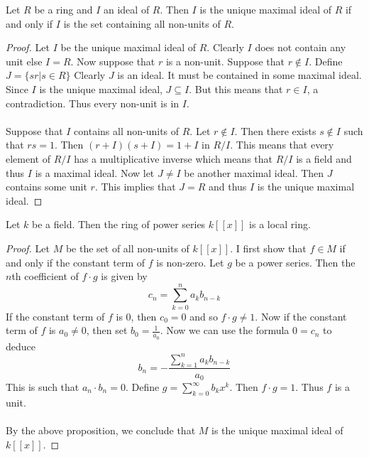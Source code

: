 \documentclass[a4paper]{article}
\begin{document}
\begin{prp}{}{} Let $R$ be a ring and $I$ an ideal of $R$. Then $I$ is the unique maximal ideal of $R$ if and only if $I$ is the set containing all non-units of $R$. 
\begin{proof}
Let $I$ be the unique maximal ideal of $R$. Clearly $I$ does not contain any unit else $I=R$. Now suppose that $r$ is a non-unit. Suppose that $r\notin I$. Define $J=\{sr|s\in R\}$ Clearly $J$ is an ideal. It must be contained in some maximal ideal. Since $I$ is the unique maximal ideal, $J\subseteq I$. But this means that $r\in I$, a contradiction. Thus every non-unit is in $I$. \\~\\
Suppose that $I$ contains all non-units of $R$. Let $r\notin I$. Then there exists $s\notin I$ such that $rs=1$. Then $(r+I)(s+I)=1+I$ in $R/I$. This means that every element of $R/I$ has a multiplicative inverse which means that $R/I$ is a field and thus $I$ is a maximal ideal. Now let $J\neq I$ be another maximal ideal. Then $J$ contains some unit $r$. This implies that $J=R$ and thus $I$ is the unique maximal ideal. 
\end{proof}
\end{prp}

\begin{eg}{}{} Let $k$ be a field. Then the ring of power series $k[[x]]$ is a local ring. 
\begin{proof}
Let $M$ be the set of all non-units of $k[[x]]$. I first show that $f\in M$ if and only if the constant term of $f$ is non-zero. Let $g$ be a power series. Then the $n$th coefficient of $f\cdot g$ is given by $$c_n=\sum_{k=0}^na_kb_{n-k}$$ If the constant term of $f$ is $0$, then $c_0=0$ and so $f\cdot g\neq 1$. Now if the constant term of $f$ is $a_0\neq 0$, then set $b_0=\frac{1}{a_0}$. Now we can use the formula $0=c_n$ to deduce $$b_n=-\frac{\sum_{k=1}^na_kb_{n-k}}{a_0}$$ This is such that $a_n\cdot b_n=0$. Define $g=\sum_{k=0}^\infty b_kx^k$. Then $f\cdot g=1$. Thus $f$ is a unit. \\~\\

By the above proposition, we conclude that $M$ is the unique maximal ideal of $k[[x]]$. 
\end{proof}
\end{eg}
\end{document}
